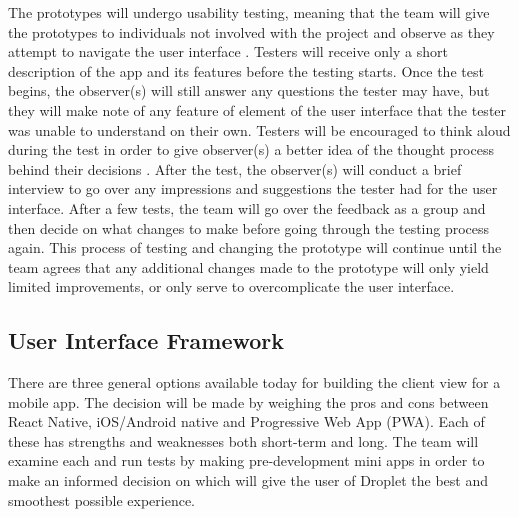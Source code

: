 \documentclass[draftclsnofoot, onecolumn, letterpaper,10pt,compsoc]{IEEEtran}
\begin{document}
The prototypes will undergo usability testing, meaning that the team will give the prototypes to individuals not involved with the project and observe as they attempt to navigate the user interface \cite{usability}. Testers will receive only a short description of the app and its features before the testing starts. Once the test begins, the observer(s) will still answer any questions the tester may have, but they will make note of any feature of element of the user interface that the tester was unable to understand on their own. Testers will be encouraged to think aloud during the test in order to give observer(s) a better idea of the thought process behind their decisions \cite{usabilitymod}. After the test, the observer(s) will conduct a brief interview to go over any impressions and suggestions the tester had for the user interface. After a few tests, the team will go over the feedback as a group and then decide on what changes to make before going through the testing process again. This process of testing and changing the prototype will continue until the team agrees that any additional changes made to the prototype will only yield limited improvements, or only serve to overcomplicate the user interface.
\subsection{User Interface Framework}

There are three general options available today for building the client view for a mobile app. The decision will be made by weighing the pros and cons between React Native, iOS/Android native and Progressive Web App (PWA). Each of these has strengths and weaknesses both short-term and long. The team will examine each and run tests by making pre-development mini apps in order to make an informed decision on which will give the user of Droplet the best and smoothest possible experience.
\end{document}
